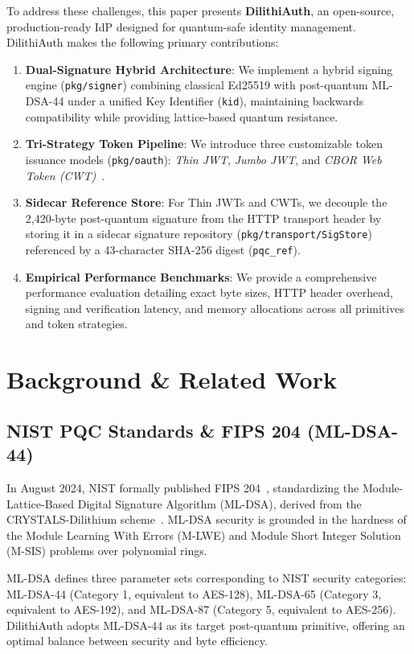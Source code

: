 \documentclass[conference]{IEEEtran}
\begin{document}
To address these challenges, this paper presents \textbf{DilithiAuth}, an open-source, production-ready IdP designed for quantum-safe identity management. DilithiAuth makes the following primary contributions:
\begin{enumerate}
    \item \textbf{Dual-Signature Hybrid Architecture}: We implement a hybrid signing engine (\texttt{pkg/signer}) combining classical Ed25519 with post-quantum ML-DSA-44 under a unified Key Identifier (\texttt{kid}), maintaining backwards compatibility while providing lattice-based quantum resistance.
    \item \textbf{Tri-Strategy Token Pipeline}: We introduce three customizable token issuance models (\texttt{pkg/oauth}): \emph{Thin JWT}, \emph{Jumbo JWT}, and \emph{CBOR Web Token (CWT)}~\cite{rfc8392}.
    \item \textbf{Sidecar Reference Store}: For Thin JWTs and CWTs, we decouple the 2,420-byte post-quantum signature from the HTTP transport header by storing it in a sidecar signature repository (\texttt{pkg/transport/SigStore}) referenced by a 43-character SHA-256 digest (\texttt{pqc\_ref}).
    \item \textbf{Empirical Performance Benchmarks}: We provide a comprehensive performance evaluation detailing exact byte sizes, HTTP header overhead, signing and verification latency, and memory allocations across all primitives and token strategies.
\end{enumerate}

\section{Background \& Related Work}

\subsection{NIST PQC Standards \& FIPS 204 (ML-DSA-44)}
In August 2024, NIST formally published FIPS 204~\cite{fips204}, standardizing the Module-Lattice-Based Digital Signature Algorithm (ML-DSA), derived from the CRYSTALS-Dilithium scheme~\cite{ducas2018}. ML-DSA security is grounded in the hardness of the Module Learning With Errors (M-LWE) and Module Short Integer Solution (M-SIS) problems over polynomial rings.

ML-DSA defines three parameter sets corresponding to NIST security categories: ML-DSA-44 (Category 1, equivalent to AES-128), ML-DSA-65 (Category 3, equivalent to AES-192), and ML-DSA-87 (Category 5, equivalent to AES-256). DilithiAuth adopts ML-DSA-44 as its target post-quantum primitive, offering an optimal balance between security and byte efficiency.
\end{document}
